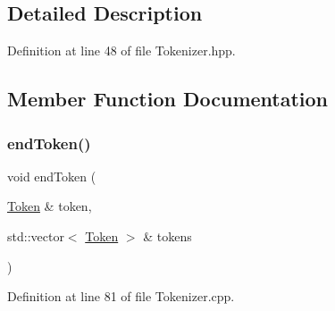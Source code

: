 \subsection{Detailed Description}


Definition at line 48 of file Tokenizer.\+hpp.



\subsection{Member Function Documentation}
\mbox{\label{classft_1_1_tokenizer_a4d9a98ce2e5ef728cfa5a68c8f726587}} 
\subsubsection{\texorpdfstring{end\+Token()}{endToken()}}
{\footnotesize\ttfamily void end\+Token (\begin{DoxyParamCaption}\item[{\hyperlink{classft_1_1_token}{Token} \&}]{token,  }\item[{std\+::vector$<$ \hyperlink{classft_1_1_token}{Token} $>$ \&}]{tokens }\end{DoxyParamCaption})\hspace{0.3cm}{\ttfamily [private]}}



Definition at line 81 of file Tokenizer.\+cpp.


